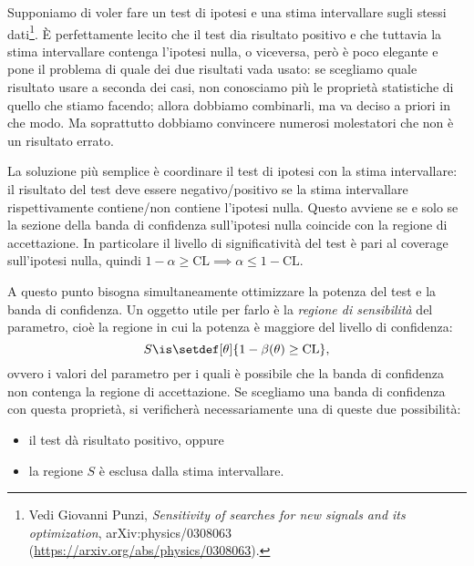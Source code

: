
Supponiamo di voler fare un test di ipotesi e una stima intervallare sugli stessi dati\footnote{Vedi Giovanni Punzi, \emph{Sensitivity of searches for new signals and its optimization}, 	arXiv:physics/0308063 (\url{https://arxiv.org/abs/physics/0308063}).}.
È perfettamente lecito che il test dia risultato positivo
e che tuttavia la stima intervallare contenga l'ipotesi nulla, o viceversa,
però è poco elegante e pone il problema di quale dei due risultati vada usato:
se scegliamo quale risultato usare a seconda dei casi,
non conosciamo più le proprietà statistiche di quello che stiamo facendo;
allora dobbiamo combinarli, ma va deciso a priori in che modo.
Ma soprattutto dobbiamo convincere numerosi molestatori che non è un risultato errato.

La soluzione più semplice è coordinare il test di ipotesi con la stima intervallare:
il risultato del test deve essere negativo/positivo
se la stima intervallare rispettivamente contiene/non contiene l'ipotesi nulla.
Questo avviene se e solo se
la sezione della banda di confidenza sull'ipotesi nulla
coincide con la regione di accettazione.
In particolare il livello di significatività del test è pari al coverage sull'ipotesi nulla,
quindi $1-\alpha\ge\mathrm{CL} \implies \alpha\le1-\mathrm{CL}$.

A questo punto bisogna simultaneamente ottimizzare la potenza del test e la banda di confidenza.
Un oggetto utile per farlo è la \emph{regione di sensibilità} del parametro,
cioè la regione in cui la potenza è maggiore del livello di confidenza:
\begin{equation*}
	S \is \setdef[\theta]{1-\beta(\theta) \ge \mathrm{CL}},
\end{equation*}
ovvero i valori del parametro per i quali è possibile
che la banda di confidenza non contenga la regione di accettazione.
Se scegliamo una banda di confidenza con questa proprietà,
si verificherà necessariamente una di queste due possibilità:
\begin{itemize}
	\item il test dà risultato positivo, oppure
	\item la regione $S$ è esclusa dalla stima intervallare.
\end{itemize}

